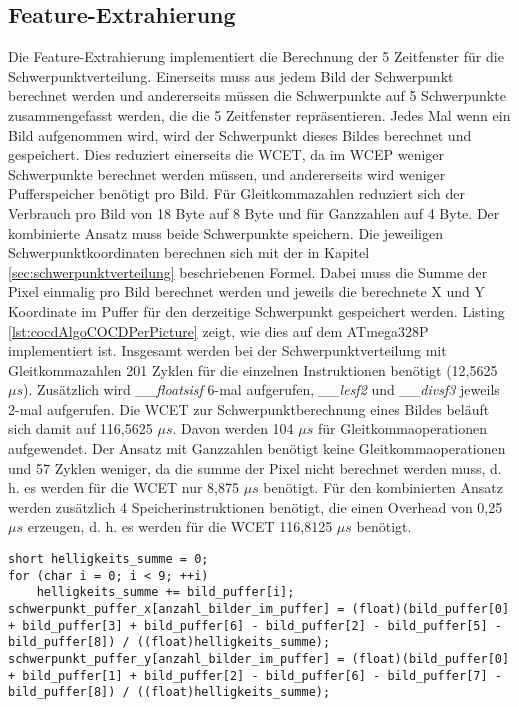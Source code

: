 \subsection{Feature-Extrahierung}
Die Feature-Extrahierung implementiert die Berechnung der 5 Zeitfenster für die Schwerpunktverteilung. Einerseits muss aus jedem Bild der Schwerpunkt berechnet werden und andererseits müssen die Schwerpunkte auf 5
Schwerpunkte zusammengefasst werden, die die 5 Zeitfenster repräsentieren.
\newline
\newline
Jedes Mal wenn ein Bild aufgenommen wird, wird der Schwerpunkt dieses Bildes berechnet und gespeichert. Dies reduziert einerseits die WCET, da im WCEP weniger Schwerpunkte berechnet werden müssen, und andererseits
wird weniger Pufferspeicher benötigt pro Bild. Für Gleitkommazahlen reduziert sich der Verbrauch pro Bild von 18 Byte auf 8 Byte und für Ganzzahlen auf 4 Byte. Der kombinierte Ansatz muss beide Schwerpunkte speichern.
Die jeweiligen Schwerpunktkoordinaten berechnen sich mit der in Kapitel \ref{sec:schwerpunktverteilung} beschriebenen Formel. Dabei muss die Summe der Pixel einmalig pro Bild berechnet werden und jeweils die
berechnete X und Y Koordinate im Puffer für den derzeitige Schwerpunkt gespeichert werden. Listing \ref{lst:cocdAlgoCOCDPerPicture} zeigt, wie dies auf dem ATmega328P implementiert ist. Insgesamt werden bei der
Schwerpunktverteilung mit Gleitkommazahlen 201 Zyklen für die einzelnen Instruktionen benötigt (12,5625 $\mu s$). Zusätzlich wird \textit{\_\_floatsisf} 6-mal aufgerufen, \textit{\_\_lesf2} und \textit{\_\_divsf3}
jeweils 2-mal aufgerufen. Die WCET zur Schwerpunktberechnung eines Bildes beläuft sich damit auf 116,5625 $\mu s$. Davon werden 104 $\mu s$ für Gleitkommaoperationen aufgewendet. Der Ansatz mit Ganzzahlen benötigt
keine Gleitkommaoperationen und 57 Zyklen weniger, da die summe der Pixel nicht berechnet werden muss, d. h. es werden für die WCET nur 8,875 $\mu s$ benötigt. Für den kombinierten Ansatz werden zusätzlich 4
Speicherinstruktionen benötigt, die einen Overhead von 0,25 $\mu s$ erzeugen, d. h. es werden für die WCET 116,8125 $\mu s$ benötigt.
\begin{lstlisting}[label=lst:cocdAlgoCOCDPerPicture,caption={Implementierung um den Schwerpunkt für ein Bild zu berechnen.}]
short helligkeits_summe = 0;
for (char i = 0; i < 9; ++i)
    helligkeits_summe += bild_puffer[i];
schwerpunkt_puffer_x[anzahl_bilder_im_puffer] = (float)(bild_puffer[0] + bild_puffer[3] + bild_puffer[6] - bild_puffer[2] - bild_puffer[5] - bild_puffer[8]) / ((float)helligkeits_summe);
schwerpunkt_puffer_y[anzahl_bilder_im_puffer] = (float)(bild_puffer[0] + bild_puffer[1] + bild_puffer[2] - bild_puffer[6] - bild_puffer[7] - bild_puffer[8]) / ((float)helligkeits_summe);
\end{lstlisting}
